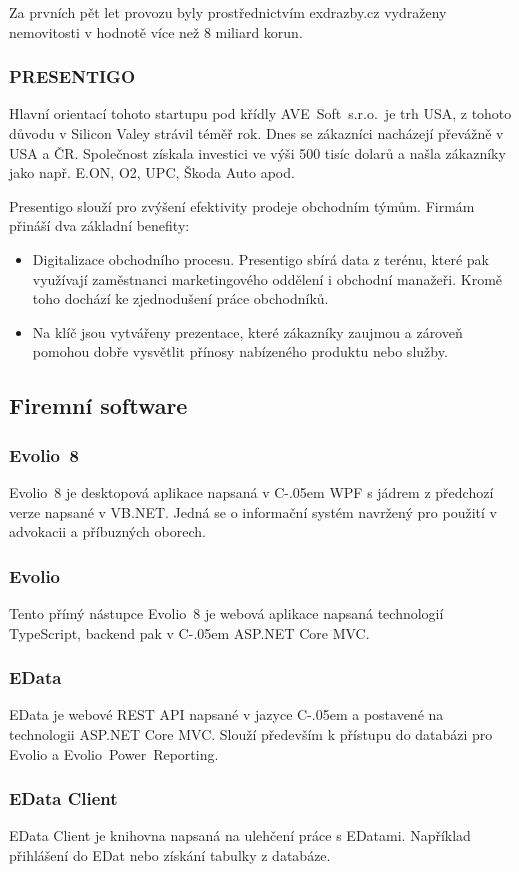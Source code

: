 \documentclass[czech,bachelorpractice,dept460,male,csharp]{diploma}
\newcommand{\AveSoft}{AVE~Soft~s.r.o.}
\newcommand{\EvolioEight}{Evolio~8}
\newcommand{\EFilters}{Evolio~Power~Reporting}
\newcommand{\EvolioX}{Evolio}
\newcommand{\EData}{EData}
\newcommand{\Csharp}{%
  {\settoheight{\dimen0}{C}C\kern-.05em \resizebox{!}{\dimen0}{\raisebox{\depth}{\#}}}}
\begin{document}
		Za prvních pět let provozu byly prostřednictvím exdrazby.cz vydraženy nemovitosti v hodnotě více než 8 miliard korun.
 		\subsubsection{PRESENTIGO}
 		Hlavní orientací tohoto startupu pod křídly \AveSoft\ je trh USA, z tohoto důvodu v Silicon Valey strávil téměř rok. Dnes se zákazníci nacházejí převážně v USA a ČR. Společnost získala investici ve výši 500 tisíc dolarů a našla zákazníky jako např. E.ON, O2, UPC, Škoda Auto apod.

		Presentigo slouží pro zvýšení efektivity prodeje obchodním týmům. Firmám přináší dva základní benefity:
		\begin{itemize}
			\item
			Digitalizace obchodního procesu. Presentigo sbírá data z terénu, které pak využívají zaměstnanci marketingového oddělení i obchodní manažeři. Kromě toho dochází ke zjednodušení práce obchodníků.
			\item
			Na klíč jsou vytvářeny prezentace, které zákazníky zaujmou a zároveň pomohou dobře vysvětlit přínosy nabízeného produktu nebo služby.
		\end{itemize}
	\subsection{Firemní software}
		\subsubsection{\EvolioEight}
		{\EvolioEight} je desktopová aplikace napsaná v {\Csharp} WPF s jádrem z předchozí verze napsané v VB.NET. Jedná se o informační systém navržený pro použití v advokacii a příbuzných oborech. 
		\subsubsection{\EvolioX}
		Tento přímý nástupce {\EvolioEight} je webová aplikace napsaná technologií TypeScript, backend pak v {\Csharp} ASP.NET Core MVC.
		\subsubsection{\EData}
		{\EData} je webové REST API napsané v jazyce {\Csharp} a postavené na technologii ASP.NET Core MVC.
		Slouží především k přístupu do databázi pro {\EvolioX} a {\EFilters}.
		\subsubsection{EData Client}
		EData Client je knihovna napsaná na ulehčení práce s EDatami. Například přihlášení do EDat nebo získání tabulky z databáze. 
\end{document}

